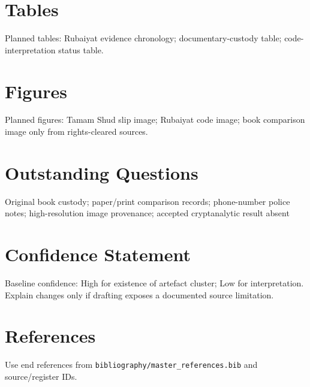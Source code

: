 \section{Tables}
Planned tables: Rubaiyat evidence chronology; documentary-custody table; code-interpretation status table.

\section{Figures}
Planned figures: Tamam Shud slip image; Rubaiyat code image; book comparison image only from rights-cleared sources.

\section{Outstanding Questions}
Original book custody; paper/print comparison records; phone-number police notes; high-resolution image provenance; accepted cryptanalytic result absent

\section{Confidence Statement}
Baseline confidence: High for existence of artefact cluster; Low for interpretation. Explain changes only if drafting exposes a documented source limitation.

\section{References}
Use end references from \texttt{bibliography/master_references.bib} and source/register IDs.
